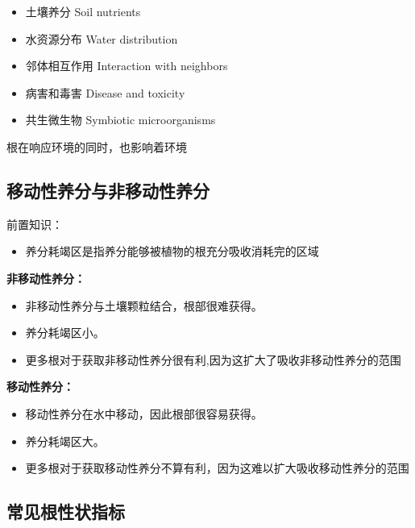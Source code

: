 \documentclass[10.5pt]{config}
\begin{document}
\begin{itemize}
\item 土壤养分 Soil nutrients
\item 水资源分布 Water distribution
\item 邻体相互作用 Interaction with neighbors
\item 病害和毒害 Disease and toxicity
\item 共生微生物 Symbiotic microorganisms
\end{itemize}

根在响应环境的同时，也影响着环境

\subsection{移动性养分与非移动性养分}

前置知识：
\begin{itemize}
    \item 养分耗竭区是指养分能够被植物的根充分吸收消耗完的区域
\end{itemize}

\textbf{非移动性养分：}
\begin{itemize}
    \item 非移动性养分与土壤颗粒结合，根部很难获得。
    \item 养分耗竭区小。
    \item 更多根对于获取非移动性养分很有利,因为这扩大了吸收非移动性养分的范围
\end{itemize}

\textbf{移动性养分：}
\begin{itemize}
    \item 移动性养分在水中移动，因此根部很容易获得。
    \item 养分耗竭区大。
    \item 更多根对于获取移动性养分不算有利，因为这难以扩大吸收移动性养分的范围
\end{itemize}

\subsection{常见根性状指标}
\end{document}
